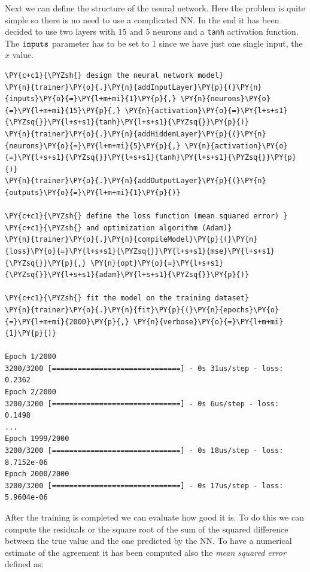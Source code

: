 Next we can define the structure of the neural network. Here the problem is quite simple so there is no need to use a complicated NN.
In the end it has been decided to use two layers with 15 and 5 neurons and a
\texttt{tanh} activation function. The \(\tt{inputs}\) parameter has to be
set to 1 since we have just one single input, the \(x\) value.

\begin{tcolorbox}[breakable, size=fbox, boxrule=1pt, pad at break*=1mm,colback=cellbackground, colframe=cellborder]
\begin{Verbatim}[commandchars=\\\{\}]
\PY{c+c1}{\PYZsh{} design the neural network model}
\PY{n}{trainer}\PY{o}{.}\PY{n}{addInputLayer}\PY{p}{(}\PY{n}{inputs}\PY{o}{=}\PY{l+m+mi}{1}\PY{p}{,} \PY{n}{neurons}\PY{o}{=}\PY{l+m+mi}{15}\PY{p}{,} \PY{n}{activation}\PY{o}{=}\PY{l+s+s1}{\PYZsq{}}\PY{l+s+s1}{tanh}\PY{l+s+s1}{\PYZsq{}}\PY{p}{)}
\PY{n}{trainer}\PY{o}{.}\PY{n}{addHiddenLayer}\PY{p}{(}\PY{n}{neurons}\PY{o}{=}\PY{l+m+mi}{5}\PY{p}{,} \PY{n}{activation}\PY{o}{=}\PY{l+s+s1}{\PYZsq{}}\PY{l+s+s1}{tanh}\PY{l+s+s1}{\PYZsq{}}\PY{p}{)}
\PY{n}{trainer}\PY{o}{.}\PY{n}{addOutputLayer}\PY{p}{(}\PY{n}{outputs}\PY{o}{=}\PY{l+m+mi}{1}\PY{p}{)}
	
\PY{c+c1}{\PYZsh{} define the loss function (mean squared error) }
\PY{c+c1}{\PYZsh{} and optimization algorithm (Adam)}
\PY{n}{trainer}\PY{o}{.}\PY{n}{compileModel}\PY{p}{(}\PY{n}{loss}\PY{o}{=}\PY{l+s+s1}{\PYZsq{}}\PY{l+s+s1}{mse}\PY{l+s+s1}{\PYZsq{}}\PY{p}{,} \PY{n}{opt}\PY{o}{=}\PY{l+s+s1}{\PYZsq{}}\PY{l+s+s1}{adam}\PY{l+s+s1}{\PYZsq{}}\PY{p}{)}
	
\PY{c+c1}{\PYZsh{} fit the model on the training dataset}
\PY{n}{trainer}\PY{o}{.}\PY{n}{fit}\PY{p}{(}\PY{n}{epochs}\PY{o}{=}\PY{l+m+mi}{2000}\PY{p}{,} \PY{n}{verbose}\PY{o}{=}\PY{l+m+mi}{1}\PY{p}{)}
	
Epoch 1/2000
3200/3200 [==============================] - 0s 31us/step - loss: 0.2362
Epoch 2/2000
3200/3200 [==============================] - 0s 6us/step - loss: 0.1498
...
Epoch 1999/2000
3200/3200 [==============================] - 0s 18us/step - loss: 8.7152e-06
Epoch 2000/2000
3200/3200 [==============================] - 0s 17us/step - loss: 5.9604e-06
\end{Verbatim}
\end{tcolorbox}

After the training is completed we can evaluate how good it is. To do
this we can compute the residuals or the square root of the sum of the
squared difference between the true value and the one predicted by the
NN. To have a numerical estimate of the agreement it has been computed also the
\emph{mean squared error} defined as:

